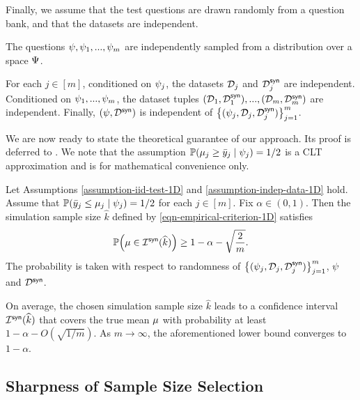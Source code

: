 Finally, we assume that the test questions are drawn randomly from a question bank, and that the datasets are independent.

\begin{assumption}\label{assumption-iid-test-1D}
The questions $\psi,\psi_1,...,\psi_m$ are independently sampled from a distribution over a space $\Psi$.
\end{assumption}

\begin{assumption}\label{assumption-indep-data-1D}
For each $j\in[m]$, conditioned on $\psi_j$, the datasets $\mathcal{D}_j$ and $\mathcal{D}^{\mathsf{syn}}_j$ are independent. Conditioned on $\psi_1,...,\psi_m$, the dataset tuples $(\mathcal{D}_1,\mathcal{D}^{\mathsf{syn}}_1),...,(\mathcal{D}_m,\mathcal{D}^{\mathsf{syn}}_m)$ are independent. Finally, $(\psi,\mathcal{D}^{\mathsf{syn}})$ is independent of $\big\{ (\psi_j,\mathcal{D}_j,\mathcal{D}^{\mathsf{syn}}_j) \big\}_{j=1}^m$.
\end{assumption}

We are now ready to state the theoretical guarantee of our approach. Its proof is deferred to . We note that the assumption $\mathbb{P}( \mu_{j} \ge \bar{y}_j \mid \psi_j ) = 1/2$ is a CLT approximation and is for mathematical convenience only.

\begin{theorem}\label{thm-coverage-1D}
Let Assumptions \ref{assumption-iid-test-1D} and \ref{assumption-indep-data-1D} hold. Assume that $\mathbb{P}( \bar{y}_j \leq \mu_{j} \mid \psi_j ) = 1/2$ for each $j\in[m]$. Fix $\alpha\in(0,1)$. Then the simulation sample size $\widehat{k}$ defined by \eqref{eqn-empirical-criterion-1D} satisfies
\[
\mathbb{P}\Big( \mu \in \mathcal{I}^{\mathsf{syn}}(\widehat{k}) \Big) \ge 1-\alpha - \sqrt{\frac{2}{m}}.
\]
The probability is taken with respect to randomness of $\big\{ ( \psi_j , \mathcal{D}_j, \mathcal{D}^{\mathsf{syn}}_j ) \big\}_{j=1}^m$, $\psi$ and $\mathcal{D}^{\mathsf{syn}}$.
\end{theorem}

On average, the chosen simulation sample size $\widehat{k}$ leads to a confidence interval $\mathcal{I}^{\mathsf{syn}}(\widehat{k})$ that covers the true mean $\mu$ with probability at least $1-\alpha-O(\sqrt{1/m})$. As $m\to\infty$, the aforementioned lower bound converges to $1-\alpha$.


\subsection{Sharpness of Sample Size Selection}

